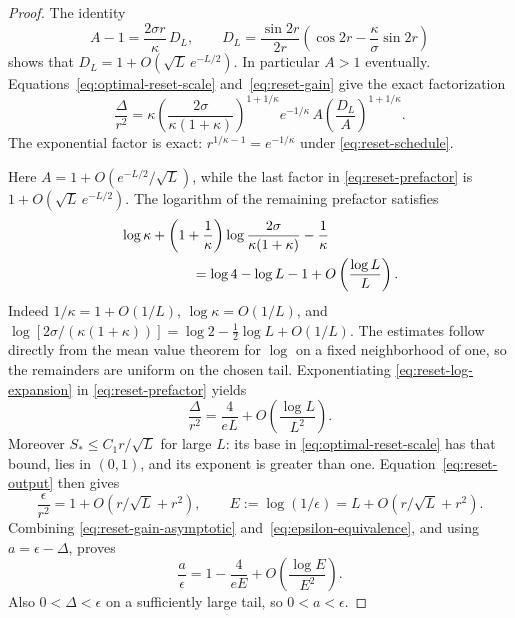 \documentclass[11pt]{article}
\theoremstyle{definition}
\theoremstyle{remark}
\begin{document}
\begin{proof}
The identity
\begin{equation}\label{eq:reset-correction}
 A-1=\frac{2\sigma r}{\kappa}\,D_L,\qquad
 D_L=\frac{\sin2r}{2r}
 \left(\cos2r-\frac\kappa\sigma\sin2r\right)
\end{equation}
shows that \(D_L=1+O(\sqrt L\,e^{-L/2})\). In particular \(A>1\) eventually. Equations~\eqref{eq:optimal-reset-scale} and~\eqref{eq:reset-gain} give the exact factorization
\begin{equation}\label{eq:reset-prefactor}
 \frac{\Delta}{r^2}
 =\kappa\left(\frac{2\sigma}{\kappa(1+\kappa)}\right)^{1+1/\kappa}
 e^{-1/\kappa}\,
 A\left(\frac{D_L}{A}\right)^{1+1/\kappa}.
\end{equation}
The exponential factor is exact: \(r^{1/\kappa-1}=e^{-1/\kappa}\) under \eqref{eq:reset-schedule}.

Here \(A=1+O(e^{-L/2}/\sqrt L)\), while the last factor in \eqref{eq:reset-prefactor} is \(1+O(\sqrt L\,e^{-L/2})\). The logarithm of the remaining prefactor satisfies
\begin{equation}\label{eq:reset-log-expansion}
 \begin{aligned}
 &\log\kappa+\left(1+\frac1\kappa\right)
   \log\frac{2\sigma}{\kappa(1+\kappa)}-\frac1\kappa\\
 &\hspace{18mm}=\log4-\log L-1+O\left(\frac{\log L}{L}\right).
 \end{aligned}
\end{equation}
Indeed \(1/\kappa=1+O(1/L)\), \(\log\kappa=O(1/L)\), and
\(\log[2\sigma/(\kappa(1+\kappa))]=\log2-\tfrac12\log L+O(1/L)\).
The estimates follow directly from the mean value theorem for \(\log\) on a fixed neighborhood of one, so the remainders are uniform on the chosen tail. Exponentiating \eqref{eq:reset-log-expansion} in \eqref{eq:reset-prefactor} yields
\begin{equation}\label{eq:reset-gain-asymptotic}
 \frac{\Delta}{r^2}=\frac{4}{eL}+O\left(\frac{\log L}{L^2}\right).
\end{equation}
Moreover \(S_*\leq C_1r/\sqrt L\) for large \(L\): its base in \eqref{eq:optimal-reset-scale} has that bound, lies in \((0,1)\), and its exponent is greater than one. Equation~\eqref{eq:reset-output} then gives
\begin{equation}\label{eq:epsilon-equivalence}
 \frac\epsilon{r^2}=1+O(r/\sqrt L+r^2),\qquad
 E:=\log(1/\epsilon)=L+O(r/\sqrt L+r^2).
\end{equation}
Combining \eqref{eq:reset-gain-asymptotic} and~\eqref{eq:epsilon-equivalence}, and using \(a=\epsilon-\Delta\), proves
\[
 \frac a\epsilon=1-\frac4{eE}+O\left(\frac{\log E}{E^2}\right).
\]
Also \(0<\Delta<\epsilon\) on a sufficiently large tail, so \(0<a<\epsilon\).


\end{proof}
\end{document}
